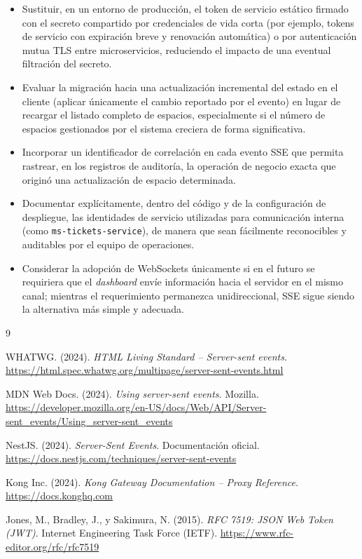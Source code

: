 \documentclass[12pt,letterpaper]{article}
\begin{document}
\begin{itemize}
  \item Sustituir, en un entorno de producción, el token de servicio estático firmado con el secreto compartido por credenciales de vida corta (por ejemplo, tokens de servicio con expiración breve y renovación automática) o por autenticación mutua TLS entre microservicios, reduciendo el impacto de una eventual filtración del secreto.
  \item Evaluar la migración hacia una actualización incremental del estado en el cliente (aplicar únicamente el cambio reportado por el evento) en lugar de recargar el listado completo de espacios, especialmente si el número de espacios gestionados por el sistema creciera de forma significativa.
  \item Incorporar un identificador de correlación en cada evento SSE que permita rastrear, en los registros de auditoría, la operación de negocio exacta que originó una actualización de espacio determinada.
  \item Documentar explícitamente, dentro del código y de la configuración de despliegue, las identidades de servicio utilizadas para comunicación interna (como \texttt{ms-tickets-service}), de manera que sean fácilmente reconocibles y auditables por el equipo de operaciones.
  \item Considerar la adopción de WebSockets únicamente si en el futuro se requiriera que el \emph{dashboard} envíe información hacia el servidor en el mismo canal; mientras el requerimiento permanezca unidireccional, SSE sigue siendo la alternativa más simple y adecuada.
\end{itemize}

\newpage

\begin{thebibliography}{9}

WHATWG. (2024). \emph{HTML Living Standard -- Server-sent events}. \url{https://html.spec.whatwg.org/multipage/server-sent-events.html}

MDN Web Docs. (2024). \emph{Using server-sent events}. Mozilla. \url{https://developer.mozilla.org/en-US/docs/Web/API/Server-sent_events/Using_server-sent_events}

NestJS. (2024). \emph{Server-Sent Events}. Documentación oficial. \url{https://docs.nestjs.com/techniques/server-sent-events}

Kong Inc. (2024). \emph{Kong Gateway Documentation -- Proxy Reference}. \url{https://docs.konghq.com}

Jones, M., Bradley, J., y Sakimura, N. (2015). \emph{RFC 7519: JSON Web Token (JWT)}. Internet Engineering Task Force (IETF). \url{https://www.rfc-editor.org/rfc/rfc7519}

\end{thebibliography}
\end{document}
